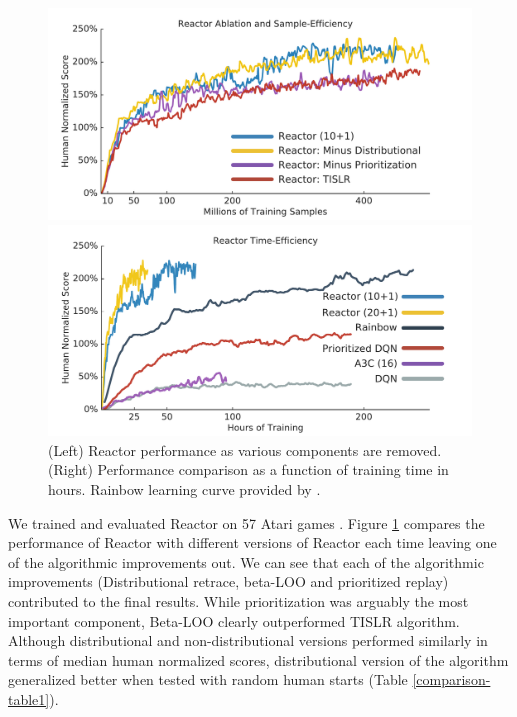 \documentclass{article}
\begin{document}
\begin{figure}
\centering
\vspace{0pt}
\begin{minipage}{.48\textwidth}
  \centerline{\includegraphics[width=1.0\textwidth]{reactor_median}}
\end{minipage}%
\vspace{0pt}
\begin{minipage}{.48\textwidth}
\vspace{0pt}
  \centering
  \includegraphics[width=1.0\textwidth]{reactor_compare_full}
\end{minipage}
  \caption{
  \small (Left) Reactor performance as various components are removed.
  (Right) Performance comparison as a function of training time in hours. Rainbow learning curve provided by \cite{rainbow}.}
  \label{learningcurves}
\end{figure}
We trained and evaluated Reactor on 57 Atari games \citep{bellemare2013arcade}. 
Figure \ref{learningcurves} compares the performance of Reactor with 
different versions of Reactor each time leaving one of the algorithmic 
improvements out. We can see that each of the algorithmic improvements 
(Distributional retrace, beta-LOO and prioritized replay) 
contributed to the final results. While prioritization was arguably the 
most important component, Beta-LOO clearly
outperformed TISLR algorithm. Although distributional and non-distributional 
versions performed similarly in terms of median human normalized scores, 
distributional version of the 
algorithm generalized better when tested with random human starts (Table 
\ref{comparison-table1}).
\end{document}
